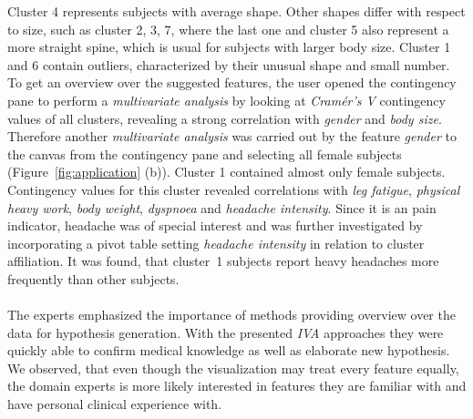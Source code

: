 \documentclass[journal]{style/vgtc} 			          %
\newcommand{\add}[1]{\textcolor{blue}{\uline{#1}}}
\newcommand{\com}[1]{\textcolor{orange}{\uline{#1}}}
\begin{document}
Cluster 4 represents subjects with average shape.
%
Other shapes differ with respect to size, such as cluster 2, 3, 7, where the last one and cluster 5 also represent a more straight spine, which is usual for subjects with larger body size.
%
Cluster 1 and 6 contain outliers, characterized by their unusual shape and small number.
%
%
To get an overview over the suggested features, the user opened the contingency pane to perform a \emph{multivariate analysis} by looking at \emph{Cram\'{e}r's V} contingency values of all clusters, revealing a strong correlation with \emph{gender} and \emph{body size}.
%
Therefore another \emph{multivariate analysis} was carried out by the feature \emph{gender} to the canvas from the contingency pane and selecting all female subjects (Figure~\ref{fig:application} (b)).
%
Cluster 1 contained almost only female subjects.
%
Contingency values for this cluster revealed correlations with \emph{leg fatigue}, \emph{physical heavy work}, \emph{body weight}, \emph{dyspnoea} and \emph{headache intensity}.
%
%
Since it is an pain indicator, headache was of special interest and was further investigated by incorporating a pivot table setting \emph{headache intensity} in relation to cluster affiliation.
%
It was found, that cluster~1 subjects report heavy headaches more frequently than other subjects.
%
%
%
%
\\\\
The experts emphasized the importance of methods providing overview over the data for hypothesis generation.
%
With the presented \emph{IVA} approaches they were quickly able to confirm medical knowledge as well as elaborate new hypothesis.
%
We observed, that even though the visualization may treat every feature equally, the domain experts is more likely interested in features they are familiar with and have personal clinical experience with.
\end{document}
